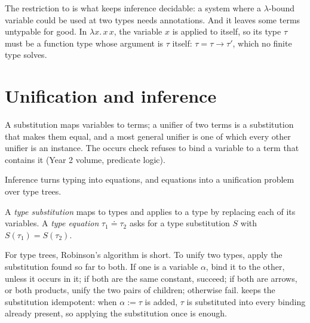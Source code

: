 The restriction to  is what keeps inference decidable: a system where a $\lambda$-bound variable could be used at two types needs annotations. And it leaves some terms untypable for good. In $\lambda x.\,x\,x$, the variable $x$ is applied to itself, so its type $\tau$ must be a function type whose argument is $\tau$ itself: $\tau = \tau \to \tau'$, which no finite type solves.

\section{Unification and inference}\label{sec:b3:type-systems:inference}

\begin{recall}
A substitution maps variables to terms; a unifier of two terms is a substitution that makes them equal, and a most general unifier is one of which every other unifier is an instance. The occurs check refuses to bind a variable to a term that contains it (Year 2 volume, predicate logic).
\end{recall}

Inference turns typing into equations, and equations into a unification problem over type trees.

\begin{definition}\label{def:b3:type-systems:unification}
A \emph{type substitution} maps  to types and applies to a type by replacing each of its variables. A \emph{type equation} $\tau_1 \doteq \tau_2$ asks for a type substitution $S$ with $S(\tau_1) = S(\tau_2)$.
\end{definition}

For type trees, Robinson's algorithm is short. To unify two types, apply the substitution found so far to both. If one is a variable $\alpha$, bind it to the other, unless it occurs in it; if both are the same constant, succeed; if both are arrows, or both products, unify the two pairs of children; otherwise fail.  keeps the substitution idempotent: when $\alpha := \tau$ is added, $\tau$ is substituted into every binding already present, so applying the substitution once is enough.

\label{lst:b3:type-systems:unify}

